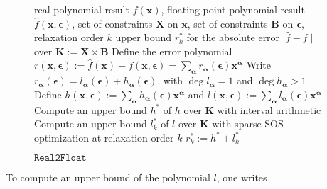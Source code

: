\documentclass[a4paper,10pt]{article}
\newcommand{\x}{\mathbf{x}}
\newcommand{\y}{\mathbf{y}}
\newcommand{\alphab}{\boldsymbol{\alpha}}
\newcommand{\epsilonb}{\boldsymbol{\epsilon}}
\def\B{\mathbf{B}}
\def\K{\mathbf{K}}
\def\X{\mathbf{X}}
\def\Y{\mathbf{Y}}
\newcommand{\realtofloat}{\mathtt{Real2Float}}
\theoremstyle{plain}
\theoremstyle{definition}
\theoremstyle{remark}
\begin{document}
\begin{figure}[!ht]
\begin{algorithmic}[1]                    
\Require real polynomial result $f(\x)$, floating-point polynomial result $\hat{f}(\x, \epsilonb)$, set of constraints $\X$ on $\x$, set of constraints $\B$ on $\epsilonb$, relaxation order $k$
\Ensure upper bound $r_k^*$ for the absolute error $\mid \hat{f} - f  \mid$ over $\K := \X \times \B$
\State Define the error polynomial $r(\x, \epsilonb) := \hat{f}(\x) - f(\x, \epsilonb) = \displaystyle\sum_{\alphab} r_{\alphab}(\epsilonb) \x^{\alphab}$
\For {each $\alphab$}
\State Write $r_{\alphab}(\epsilonb) = l_{\alphab}(\epsilonb) + h_{\alphab}(\epsilonb)$, with $\deg l_{\alphab} = 1$ and $\deg h_{\alphab} > 1$
\EndFor
\State Define $h(\x, \epsilonb) := \displaystyle\sum_{\alphab} h_{\alphab}(\epsilonb) \x^{\alphab}$ and $l(\x,\epsilonb):= \displaystyle\sum_{\alphab} l_{\alphab}(\epsilonb) \x^{\alphab}$
\State Compute an upper bound $h^*$ of $h$ over $\K$ with interval arithmetic
\State Compute an upper bound $l_k^*$ of $l$ over $\K$ with sparse SOS optimization at relaxation order $k$ \label{line:boundq}
\State \Return $r_k^* := h^* + l_k^*$
\end{algorithmic}
\caption{$\realtofloat$}
\label{alg:realtofloat}
\end{figure}
To compute an upper bound of the polynomial $l$, one writes
\end{document}
